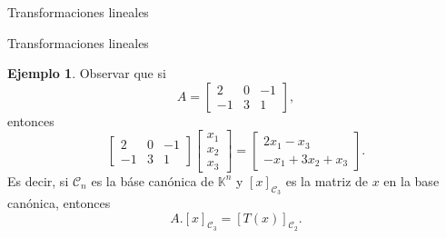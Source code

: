 \documentclass[a4paper,12pt,twoside,spanish,reqno]{amsbook}
\theoremstyle{definition}
\newtheorem{ejemplo}{Ejemplo}[section]
\theoremstyle{remark}
\newcommand{\K}{\mathbb K}
\begin{document}
\begin{chapter}{Transformaciones lineales}
\begin{section}{Transformaciones lineales}
\begin{ejemplo}
            Observar que si 
            $$
             A = \begin{bmatrix}
             2&0&-1 \\ -1&3&1
             \end{bmatrix},
            $$
            entonces
            $$
            \begin{bmatrix}
            2&0&-1 \\ -1&3&1
            \end{bmatrix} 
            \begin{bmatrix}
            x_1\\x_2\\x_3
            \end{bmatrix} =
            \begin{bmatrix}
            2x_1 - x_3 \\ -x_1+3x_2+x_3
            \end{bmatrix}.
            $$
            Es decir,  si $\mathcal C_n$  es la báse canónica de $\K^n$ y $[x]_{\mathcal C_3}$ es la matriz de $x$ en la base canónica,  entonces 
            $$
            A.[x]_{\mathcal C_3} = [T(x)]_{\mathcal C_2}.
            $$ 
            \end{ejemplo}
        

\end{section}
\end{chapter}
\end{document}
